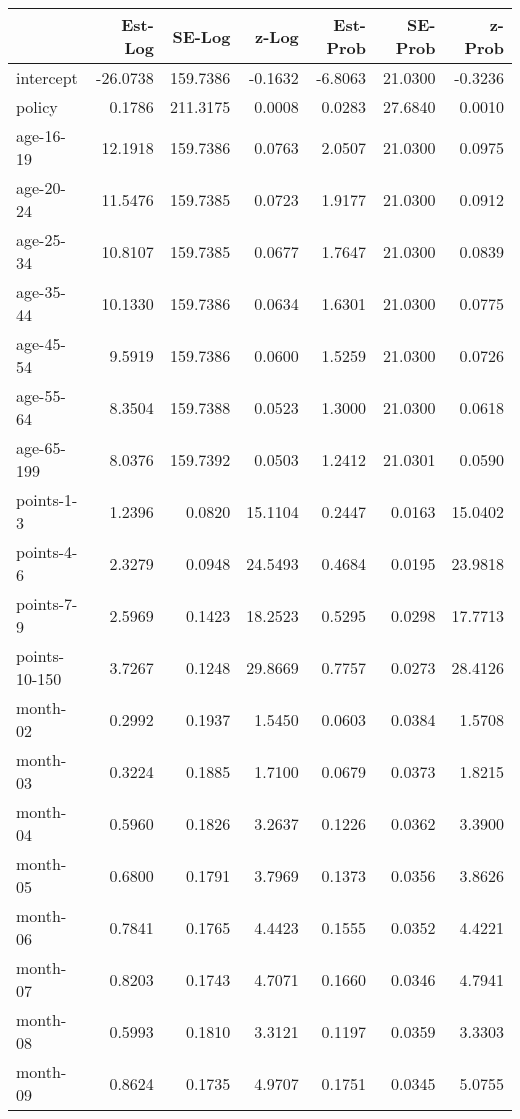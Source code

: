 \documentclass[10pt]{article}
\begin{document}
\begin{table}[ht]
\centering
\begin{tabular}{lrrrrrr}
  \hline
 & Est-Log & SE-Log & z-Log & Est-Prob & SE-Prob & z-Prob \\ 
  \hline
intercept & -26.0738 & 159.7386 & -0.1632 & -6.8063 & 21.0300 & -0.3236 \\ 
  policy & 0.1786 & 211.3175 & 0.0008 & 0.0283 & 27.6840 & 0.0010 \\ 
  age-16-19 & 12.1918 & 159.7386 & 0.0763 & 2.0507 & 21.0300 & 0.0975 \\ 
  age-20-24 & 11.5476 & 159.7385 & 0.0723 & 1.9177 & 21.0300 & 0.0912 \\ 
  age-25-34 & 10.8107 & 159.7385 & 0.0677 & 1.7647 & 21.0300 & 0.0839 \\ 
  age-35-44 & 10.1330 & 159.7386 & 0.0634 & 1.6301 & 21.0300 & 0.0775 \\ 
  age-45-54 & 9.5919 & 159.7386 & 0.0600 & 1.5259 & 21.0300 & 0.0726 \\ 
  age-55-64 & 8.3504 & 159.7388 & 0.0523 & 1.3000 & 21.0300 & 0.0618 \\ 
  age-65-199 & 8.0376 & 159.7392 & 0.0503 & 1.2412 & 21.0301 & 0.0590 \\ 
  points-1-3 & 1.2396 & 0.0820 & 15.1104 & 0.2447 & 0.0163 & 15.0402 \\ 
  points-4-6 & 2.3279 & 0.0948 & 24.5493 & 0.4684 & 0.0195 & 23.9818 \\ 
  points-7-9 & 2.5969 & 0.1423 & 18.2523 & 0.5295 & 0.0298 & 17.7713 \\ 
  points-10-150 & 3.7267 & 0.1248 & 29.8669 & 0.7757 & 0.0273 & 28.4126 \\ 
  month-02 & 0.2992 & 0.1937 & 1.5450 & 0.0603 & 0.0384 & 1.5708 \\ 
  month-03 & 0.3224 & 0.1885 & 1.7100 & 0.0679 & 0.0373 & 1.8215 \\ 
  month-04 & 0.5960 & 0.1826 & 3.2637 & 0.1226 & 0.0362 & 3.3900 \\ 
  month-05 & 0.6800 & 0.1791 & 3.7969 & 0.1373 & 0.0356 & 3.8626 \\ 
  month-06 & 0.7841 & 0.1765 & 4.4423 & 0.1555 & 0.0352 & 4.4221 \\ 
  month-07 & 0.8203 & 0.1743 & 4.7071 & 0.1660 & 0.0346 & 4.7941 \\ 
  month-08 & 0.5993 & 0.1810 & 3.3121 & 0.1197 & 0.0359 & 3.3303 \\ 
  month-09 & 0.8624 & 0.1735 & 4.9707 & 0.1751 & 0.0345 & 5.0755 \\ 

\end{tabular}
\end{table}
\end{document}
